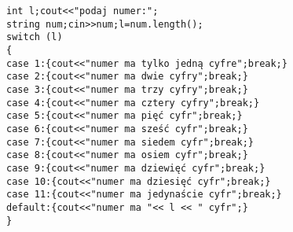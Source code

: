 \begin{verbatim}
int l;cout<<"podaj numer:";
string num;cin>>num;l=num.length();
switch (l)
{
case 1:{cout<<"numer ma tylko jedną cyfre";break;}
case 2:{cout<<"numer ma dwie cyfry";break;}
case 3:{cout<<"numer ma trzy cyfry";break;}
case 4:{cout<<"numer ma cztery cyfry";break;}
case 5:{cout<<"numer ma pięć cyfr";break;}
case 6:{cout<<"numer ma sześć cyfr";break;}
case 7:{cout<<"numer ma siedem cyfr";break;}
case 8:{cout<<"numer ma osiem cyfr";break;}
case 9:{cout<<"numer ma dziewięć cyfr";break;}
case 10:{cout<<"numer ma dziesięć cyfr";break;}
case 11:{cout<<"numer ma jedynaście cyfr";break;}
default:{cout<<"numer ma "<< l << " cyfr";}
}
\end{verbatim}